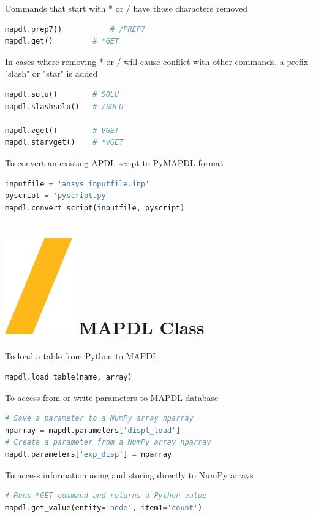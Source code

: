 \documentclass[9pt,landscape]{article}
\begin{document}
\begin{multicols}{3}
Commands that start with * or / have those characters removed
\begin{lstlisting}[language=Python]
mapdl.prep7()	        # /PREP7
mapdl.get()	        # *GET
\end{lstlisting}

In cases where removing * or / will cause conflict with other commands, a prefix "slash" or "star" is added
\begin{lstlisting}[language=Python]
mapdl.solu()		# SOLU
mapdl.slashsolu()	# /SOLU

mapdl.vget()		# VGET
mapdl.starvget()	# *VGET
\end{lstlisting} 

\columnbreak
To convert an existing APDL script to PyMAPDL format
\begin{lstlisting}[language=Python]
inputfile = 'ansys_inputfile.inp'
pyscript = 'pyscript.py'
mapdl.convert_script(inputfile, pyscript)
\end{lstlisting} 

\section{\includegraphics[height=\fontcharht\font`\S]{slash.png} MAPDL Class}
To load a table from Python to MAPDL
\begin{lstlisting}[language=Python]
mapdl.load_table(name, array)
\end{lstlisting} 

To access from or write parameters to MAPDL database
\begin{lstlisting}[language=Python]
# Save a parameter to a NumPy array nparray
nparray = mapdl.parameters['displ_load']
# Create a parameter from a NumPy array nparray
mapdl.parameters['exp_disp'] = nparray
\end{lstlisting} 

To access information using  and  storing directly to NumPy arrays
\begin{lstlisting}[language=Python]
# Runs *GET command and returns a Python value
mapdl.get_value(entity='node', item1='count')


\end{lstlisting}
\end{multicols}
\end{document}
